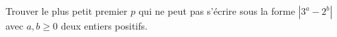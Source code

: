 Trouver le plus petit premier $p$ qui ne peut pas s'écrire sous la forme $|3^a-2^b|$ avec $a, b \ge 0$ deux entiers positifs.